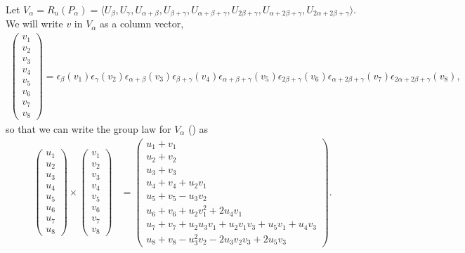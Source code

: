 			Let $V_\alpha = R_u(P_\alpha) = \langle U_\beta, U_\gamma, U_{\alpha+\beta}, U_{\beta+\gamma}, U_{\alpha+\beta+\gamma}, U_{2\beta+\gamma}, U_{\alpha+2\beta+\gamma}, U_{2\alpha+2\beta+\gamma}\rangle$.
			We will write $v$ in $V_\alpha$ as a column vector,
			\begin{align*}
			\left(\begin{matrix}
					v_1\\
					v_2\\
					v_3\\
					v_4\\
					v_5\\
					v_6\\
					v_7\\
					v_8
					\end{matrix}\right)
=\epsilon_{\beta}(v_1)
\epsilon_{\gamma}(v_2)
\epsilon_{\alpha+\beta}(v_3)
\epsilon_{\beta+\gamma}(v_4)
\epsilon_{\alpha+\beta+\gamma}(v_5)
\epsilon_{2\beta+\gamma}(v_6)
\epsilon_{\alpha+2\beta+\gamma}(v_7)
	\epsilon_{2\alpha+2\beta+\gamma}(v_8),
	\end{align*}
	so that we can write the group law for $V_\alpha$ (\cite[\S 33.3, \S 33.4]{humphreys1975linear}) as
	\begin{align*}
	\left(\begin{matrix}
			u_1\\
			u_2\\
			u_3\\
			u_4\\
			u_5\\
			u_6\\
			u_7\\
			u_8
			\end{matrix}\right)
	\times
	\left(\begin{matrix}
			v_1\\
			v_2\\
			v_3\\
			v_4\\
			v_5\\
			v_6\\
			v_7\\
			v_8
			\end{matrix}\right)
	&=
	\left(\begin{matrix}
			u_1 + v_1\\
			u_2 + v_2\\
			u_3 + v_3\\
			u_4 + v_4 + u_2v_1\\
			u_5 + v_5 - u_3v_2\\
			u_6 + v_6 + u_2v_1^2 + 2u_4v_1\\
			u_7 + v_7 + u_2u_3v_1 + u_2v_1v_3 + u_5v_1 + u_4v_3\\
			u_8 + v_8 - u_3^2v_2 - 2u_3v_2v_3 + 2u_5v_3
			\end{matrix}\right).
	\end{align*}
